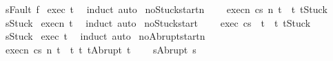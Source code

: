 \begin{isabellebody}
\ \ \ {\isachardoublequoteopen}s{\isasymnoteq}Fault\ f{\isachardoublequoteclose}\isanewline
%
\isadelimproof
%
\endisadelimproof
%
\isatagproof
{}\isamarkupfalse%
\ exec\ t\ \isamarkupfalse%
\ {\isacharparenleft}induct{\isacharparenright}\ auto%
\endisatagproof
{\isafoldproof}%
%
\isadelimproof
\isanewline
%
\endisadelimproof
\isanewline
{}\isamarkupfalse%
\ noStuck{\isacharunderscore}startn{\isacharcolon}\ \isanewline
\ \ \ execn{\isacharcolon}\ {\isachardoublequoteopen}{\isasymGamma}{\isasymturnstile}{\isasymlangle}c{\isacharcomma}s{\isasymrangle}\ {\isacharequal}n{\isasymRightarrow}\ t{\isachardoublequoteclose}\ \ t{\isacharcolon}\ {\isachardoublequoteopen}t{\isasymnoteq}Stuck{\isachardoublequoteclose}\ \isanewline
\ \ \ {\isachardoublequoteopen}s{\isasymnoteq}Stuck{\isachardoublequoteclose}\isanewline
%
\isadelimproof
%
\endisadelimproof
%
\isatagproof
{}\isamarkupfalse%
\ execn\ t\ \isamarkupfalse%
\ {\isacharparenleft}induct{\isacharparenright}\ auto%
\endisatagproof
{\isafoldproof}%
%
\isadelimproof
\isanewline
%
\endisadelimproof
\isanewline
{}\isamarkupfalse%
\ noStuck{\isacharunderscore}start{\isacharcolon}\ \isanewline
\ \ \ exec{\isacharcolon}\ {\isachardoublequoteopen}{\isasymGamma}{\isasymturnstile}{\isasymlangle}c{\isacharcomma}s{\isasymrangle}\ {\isasymRightarrow}\ t{\isachardoublequoteclose}\ \ t{\isacharcolon}\ {\isachardoublequoteopen}t{\isasymnoteq}Stuck{\isachardoublequoteclose}\ \isanewline
\ \ \ {\isachardoublequoteopen}s{\isasymnoteq}Stuck{\isachardoublequoteclose}\isanewline
%
\isadelimproof
%
\endisadelimproof
%
\isatagproof
{}\isamarkupfalse%
\ exec\ t\ \isamarkupfalse%
\ {\isacharparenleft}induct{\isacharparenright}\ auto%
\endisatagproof
{\isafoldproof}%
%
\isadelimproof
\isanewline
%
\endisadelimproof
\isanewline
{}\isamarkupfalse%
\ noAbrupt{\isacharunderscore}startn{\isacharcolon}\ \isanewline
\ \ \ execn{\isacharcolon}\ {\isachardoublequoteopen}{\isasymGamma}{\isasymturnstile}{\isasymlangle}c{\isacharcomma}s{\isasymrangle}\ {\isacharequal}n{\isasymRightarrow}\ t{\isachardoublequoteclose}\ \ t{\isacharcolon}\ {\isachardoublequoteopen}{\isasymforall}t{\isacharprime}{\isachardot}\ t{\isasymnoteq}Abrupt\ t{\isacharprime}{\isachardoublequoteclose}\ \isanewline
\ \ \ {\isachardoublequoteopen}s{\isasymnoteq}Abrupt\ s{\isacharprime}{\isachardoublequoteclose}\isanewline

\end{isabellebody}
